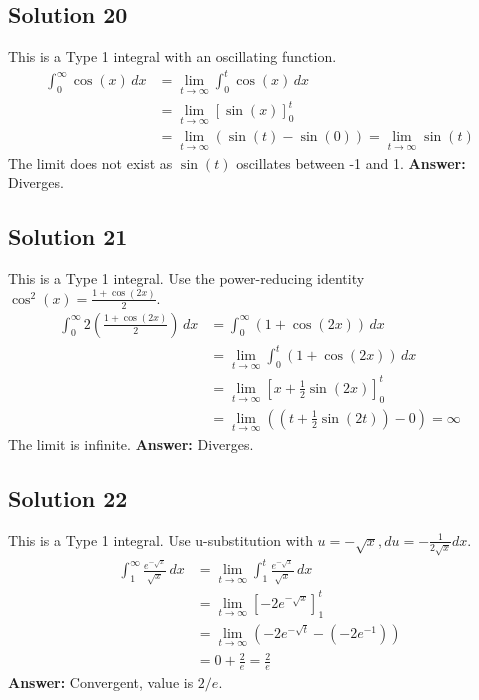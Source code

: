 \documentclass{article}
\begin{document}
\subsection*{Solution 20}
This is a Type 1 integral with an oscillating function.
\begin{align*}
\int_{0}^{\infty} \cos(x) \,dx &= \lim_{t \to \infty} \int_{0}^{t} \cos(x) \,dx \\
&= \lim_{t \to \infty} [\sin(x)]_{0}^{t} \\
&= \lim_{t \to \infty} (\sin(t) - \sin(0)) = \lim_{t \to \infty} \sin(t)
\end{align*}
The limit does not exist as $\sin(t)$ oscillates between -1 and 1.
\textbf{Answer:} Diverges.

\subsection*{Solution 21}
This is a Type 1 integral. Use the power-reducing identity $\cos^2(x) = \frac{1+\cos(2x)}{2}$.
\begin{align*}
\int_{0}^{\infty} 2\left(\frac{1+\cos(2x)}{2}\right) \,dx &= \int_{0}^{\infty} (1+\cos(2x)) \,dx \\
&= \lim_{t \to \infty} \int_{0}^{t} (1+\cos(2x)) \,dx \\
&= \lim_{t \to \infty} \left[ x + \frac{1}{2}\sin(2x) \right]_{0}^{t} \\
&= \lim_{t \to \infty} \left( (t + \frac{1}{2}\sin(2t)) - 0 \right) = \infty
\end{align*}
The limit is infinite.
\textbf{Answer:} Diverges.

\subsection*{Solution 22}
This is a Type 1 integral. Use u-substitution with $u=-\sqrt{x}, du = -\frac{1}{2\sqrt{x}}dx$.
\begin{align*}
\int_{1}^{\infty} \frac{e^{-\sqrt{x}}}{\sqrt{x}} \,dx &= \lim_{t \to \infty} \int_{1}^{t} \frac{e^{-\sqrt{x}}}{\sqrt{x}} \,dx \\
&= \lim_{t \to \infty} \left[ -2e^{-\sqrt{x}} \right]_{1}^{t} \\
&= \lim_{t \to \infty} \left( -2e^{-\sqrt{t}} - (-2e^{-1}) \right) \\
&= 0 + \frac{2}{e} = \frac{2}{e}
\end{align*}
\textbf{Answer:} Convergent, value is $2/e$.
\end{document}
